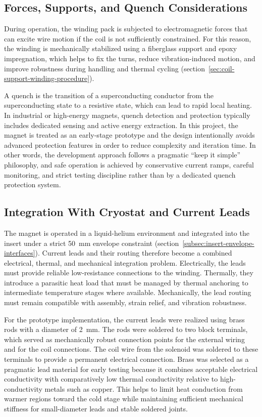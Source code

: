 \documentclass[FM,DP,EN,twoside]{tulthesis}
\begin{document}
\subsection{Forces, Supports, and Quench Considerations}
\label{subsec:forces-supports-quench}
During operation, the winding pack is subjected to electromagnetic forces that can excite wire motion if the coil is not sufficiently constrained. For this reason, the winding is mechanically stabilized using a fiberglass support and epoxy impregnation, which helps to fix the turns, reduce vibration-induced motion, and improve robustness during handling and thermal cycling (section~\ref{sec:coil-support-winding-procedure}).

A quench is the transition of a superconducting conductor from the superconducting state to a resistive state, which can lead to rapid local heating. In industrial or high-energy magnets, quench detection and protection typically includes dedicated sensing and active energy extraction. In this project, the magnet is treated as an early-stage prototype and the design intentionally avoids advanced protection features in order to reduce complexity and iteration time. In other words, the development approach follows a pragmatic ``keep it simple'' philosophy, and safe operation is achieved by conservative current ramps, careful monitoring, and strict testing discipline rather than by a dedicated quench protection system.

\subsection{Integration With Cryostat and Current Leads}
\label{subsec:integration-cryostat-current-leads}
The magnet is operated in a liquid-helium environment and integrated into the insert under a strict \SI{50}{\milli\meter} envelope constraint (section~\ref{subsec:insert-envelope-interfaces}). Current leads and their routing therefore become a combined electrical, thermal, and mechanical integration problem. Electrically, the leads must provide reliable low-resistance connections to the winding. Thermally, they introduce a parasitic heat load that must be managed by thermal anchoring to intermediate temperature stages where available. Mechanically, the lead routing must remain compatible with assembly, strain relief, and vibration robustness.

For the prototype implementation, the current leads were realized using brass rods with a diameter of \SI{2}{\milli\meter}. The rods were soldered to two block terminals, which served as mechanically robust connection points for the external wiring and for the coil connections. The coil wire from the solenoid was soldered to these terminals to provide a permanent electrical connection. Brass was selected as a pragmatic lead material for early testing because it combines acceptable electrical conductivity with comparatively low thermal conductivity relative to high-conductivity metals such as copper. This helps to limit heat conduction from warmer regions toward the cold stage while maintaining sufficient mechanical stiffness for small-diameter leads and stable soldered joints.
\end{document}
